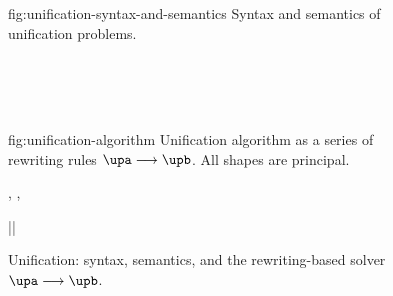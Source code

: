 \documentclass[acmsmall,screen,nonacm%
\Anonymous{,anonymous}{}%
\Final{}{,review}%
]{acmart}
\begin{document}
\begin{figure}[tp]
\begin{mathparsubfig}
  {fig:unification-syntax-and-semantics}
  {Syntax and semantics of unification problems.}
  \begin{minipage}[l]{0.7\textwidth}%
    \begin{bnfgrammar}[\noleftfill]%
       \\
       \\
      \entry[Constraints]{\c}{
        \dots \and \ueq
      } \\
    \end{bnfgrammar}
    \hfill
  \end{minipage}
  \hfill
\end{mathparsubfig}

\medskip

\begin{mathparsubfig}
  {fig:unification-algorithm}
  {Unification algorithm as a series of rewriting rules
   $\upa \unif \upb$. All shapes are principal.}
   \rewrite[U-Exists]
      {(\cexists \alpha \upa) \cand \upb }{ \tv \disjoint \upb}
      {\cexists \tv {\upa \cand \upb}}

    \rewrite[U-Cycle]
      {\up }{ \cyclic \up}
      {\cfalse}

    \rewrite[U-True]
      {\up \cand \ctrue}
      {}
      {\up}

    \rewrite[U-False]
      {\Up\where\cfalse }{ \Up \neq \hole}
      {\cfalse}

    \rewrite[U-Merge]
      {\cunif \tv \ueqa \cand \cunif \tv \ueqb}
      {}
      {\cunif \tv {\cunif \ueqa \ueqb}}

    \rewrite[U-Stutter]
      {\cunif \tv {\cunif \tv \ueq}}
      {}
      {\cunif \tv \ueq}

    \rewrite[U-Name]
      {\cunif {\pshapp \parens{\tys, \ti, \typs}} \ueq }
      { \tv \disjoint \tys, \typs, \ueq \\ \ti \notin \TyVars}
      {\cexists \tv {\cunif \tv \ti \cand \cunif {\pshapp \parens{\tys, \tv, \typs}} \ueq}}

    \rewrite[U-Decomp]
      {\cunif {\pshapp \tvs} {\cunif {\pshapp \tvbs} \ueq}}
      {}
      {\cunif {\pshapp \tvs} \ueq \cand \cunif \tvs \tvbs}

    \rewrite[U-Clash]
      {\cunif {\pshapp \tvs} {\cunif {\pshapp[\shp]\tvbs } \ueq }}{
       \sh \neq \shp}
      {\cfalse}

    \rewrite[U-Trivial]
      {\ueq }
      {|\ueq| }
      {\ctrue}
\end{mathparsubfig}
\caption{Unification: syntax, semantics, and the rewriting-based solver $\upa \unif \upb$.}
\label{fig:unification}
\end{figure}
\end{document}
